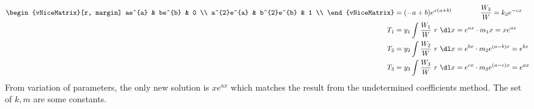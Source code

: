 \begin{enumerate}
\begin{align}
\begin{vNiceMatrix}[r, margin]
                              ae^{a}     & be^{b}     & 0 \\
                              a^{2}e^{a} & b^{2}e^{b} & 1 \\
                          \end{vNiceMatrix}  & = (- a + b) e^{x(a+b)} \qquad\qquad \frac{W_3}{W} = k_3 e^{-cx}                        \\
              T_1                                         & = y_1 \int \frac{W_1}{W}\ r\ \dl x = e^{ax} \cdot m_1 x = xe^{ax}         \\
              T_2                                         & = y_2 \int \frac{W_2}{W}\ r\ \dl x = e^{bx} \cdot m_2 e^{(a-b)x} = e^{bx} \\
              T_3                                         & = y_3 \int \frac{W_3}{W}\ r\ \dl x = e^{cx} \cdot m_3 e^{(a-c)x} = e^{ax} \\
          \end{align}
          From variation of parameters, the only new solution is $ xe^{ax} $ which
          matches the result from the undetermined coefficients method. The set of
          $ k, m $ are some constants.
\end{enumerate}